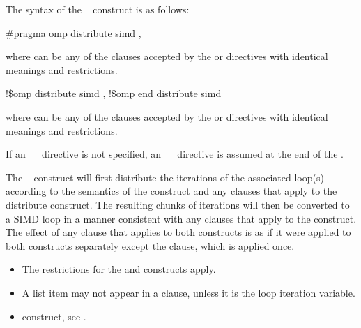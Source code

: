 {{{{\syntax
The syntax of the ~ construct is as follows:

\ccppspecificstart
\begin{boxedcode}
\#pragma omp distribute simd \plc{[clause[ [},\plc{] clause] ... ] newline}
\end{boxedcode}

where  can be any of the clauses accepted by the  or  
directives with identical meanings and restrictions.
\ccppspecificend

\fortranspecificstart
\begin{boxedcode}
!\$omp distribute simd \plc{[clause[ [},\plc{] clause] ... ]}
\plc{[}!\$omp end distribute simd\plc{]}
\end{boxedcode}

where  can be any of the clauses accepted by the  or  
directives with identical meanings and restrictions.

If an ~~ directive is not specified, an ~~
directive is assumed at the end of the .
\fortranspecificend

\descr
The ~ construct will first distribute the iterations of the associated 
loop(s) according to the semantics of the  construct and any clauses that 
apply to the distribute construct. The resulting chunks of iterations will then be 
converted to a SIMD loop in a manner consistent with any clauses that apply to the 
 construct. The effect of any clause that applies to both constructs is as if it were applied to both constructs separately except the  clause, which is applied once.

\restrictions
\begin{itemize}
\item The restrictions for the  and  constructs apply.

\item A list item may not appear in a  clause, unless it is the loop iteration variable.
\end{itemize}

\crossreferences
\begin{itemize}
\item {} construct, see 
.


\end{itemize}}}}}
